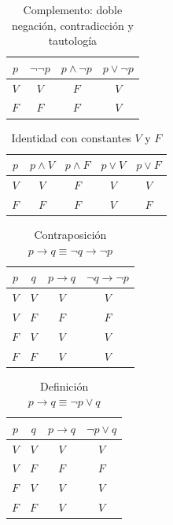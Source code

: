 \documentclass[11pt,a4paper,openany]{book}
\begin{document}
\begin{table}[H]
\centering
\caption{Complemento: doble negaci\'on, contradicci\'on y tautolog\'ia}
\begin{tabular}{c|c|c|c}
\toprule
$p$ & $\lnot\lnot p$ & $p \land \lnot p$ & $p \lor \lnot p$ \\
\midrule
$V$ & $V$ & $F$ & $V$ \\
$F$ & $F$ & $F$ & $V$ \\
\bottomrule
\end{tabular}
\end{table}

\begin{table}[H]
\centering
\caption{Identidad con constantes $V$ y $F$}
\begin{tabular}{c|c|c|c|c}
\toprule
$p$ & $p \land V$ & $p \land F$ & $p \lor V$ & $p \lor F$ \\
\midrule
$V$ & $V$ & $F$ & $V$ & $V$ \\
$F$ & $F$ & $F$ & $V$ & $F$ \\
\bottomrule
\end{tabular}
\end{table}

\begin{table}[H]
\centering
\caption{Contraposici\'on $p \to q \equiv \lnot q \to \lnot p$}
\begin{tabular}{cc|c|c}
\toprule
$p$ & $q$ & $p \to q$ & $\lnot q \to \lnot p$ \\
\midrule
$V$ & $V$ & $V$ & $V$ \\
$V$ & $F$ & $F$ & $F$ \\
$F$ & $V$ & $V$ & $V$ \\
$F$ & $F$ & $V$ & $V$ \\
\bottomrule
\end{tabular}
\end{table}

\begin{table}[H]
\centering
\caption{Definici\'on $p \to q \equiv \lnot p \lor q$}
\begin{tabular}{cc|c|c}
\toprule
$p$ & $q$ & $p \to q$ & $\lnot p \lor q$ \\
\midrule
$V$ & $V$ & $V$ & $V$ \\
$V$ & $F$ & $F$ & $F$ \\
$F$ & $V$ & $V$ & $V$ \\
$F$ & $F$ & $V$ & $V$ \\
\bottomrule
\end{tabular}
\end{table}
\end{document}
